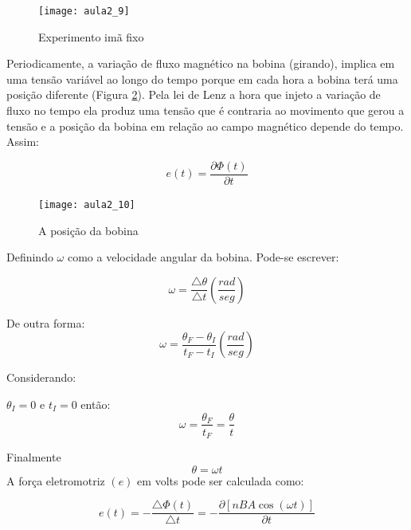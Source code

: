 \begin{figure}[H]
\begin{centering}
\texttt{[image: aula2\_9]}\protect\caption{\label{fig:aula2_9}Experimento imã fixo }
\end{centering}

\end{figure}

Periodicamente, a variação de fluxo magnético na bobina (girando),
implica em uma tensão variável ao longo do tempo porque em cada hora
a bobina terá uma posição diferente (Figura \ref{fig:aula2_10}). Pela lei de Lenz a hora que injeto
a variação de fluxo no tempo ela produz uma tensão que é contraria
ao movimento que gerou a tensão e a posição da bobina em relação ao
campo magnético depende do tempo. Assim:

\begin{equation}\label{eq:et}
e(t)=\frac{\partial\Phi(t)}{\partial t}
\end{equation}

\begin{figure}[H]
\begin{centering}
\texttt{[image: aula2\_10]}\protect\caption{\label{fig:aula2_10}A posição da bobina }
\end{centering}

\end{figure}
Definindo $\omega$ como a velocidade angular da bobina. Pode-se escrever:

\begin{equation}\label{eq:omega}
\omega=\frac{\triangle\theta}{\triangle t}(\frac{rad}{seg})
\end{equation}

De outra forma:
\begin{equation}\label{eq:omega2}
\omega=\frac{\theta_{F}-\theta_{I}}{t_{F}-t_{I}}(\frac{rad}{seg})
\end{equation}

Considerando:

$\theta_{I}=0$ e $t_{I}=0$ então:
\begin{equation}\label{eq:omega3}
\omega=\frac{\theta_{F}}{t_{F}}=\frac{\theta}{t}
\end{equation}

Finalmente
\begin{equation}\label{eq:omega4}
\theta=\omega t
\end{equation}
A força eletromotriz $(e)$ em volts pode ser calculada como:

\begin{equation}\label{eq:ele}
e(t)=-\frac{\triangle\Phi(t)}{\triangle t}=-\frac{\partial[nBA\cos(\omega t)]}{\partial t}
\end{equation}

